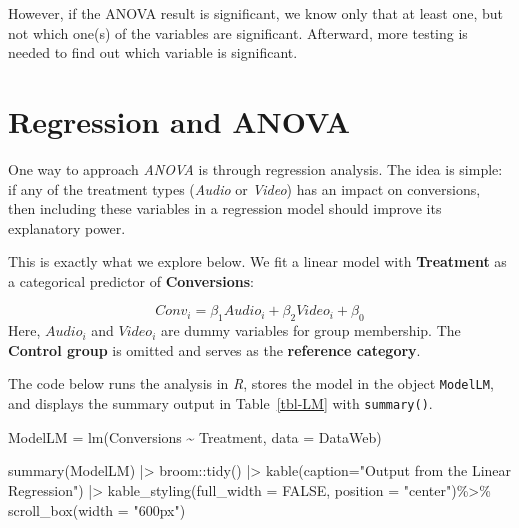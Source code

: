 \documentclass[
  letterpaper,
  DIV=11,
  numbers=noendperiod]{scrartcl}
\newenvironment{Shaded}{\begin{snugshade}}{\end{snugshade}}
\newcommand{\AttributeTok}[1]{\textcolor[rgb]{0.40,0.45,0.13}{#1}}
\newcommand{\ConstantTok}[1]{\textcolor[rgb]{0.56,0.35,0.01}{#1}}
\newcommand{\FunctionTok}[1]{\textcolor[rgb]{0.28,0.35,0.67}{#1}}
\newcommand{\NormalTok}[1]{\textcolor[rgb]{0.00,0.23,0.31}{#1}}
\newcommand{\OtherTok}[1]{\textcolor[rgb]{0.00,0.23,0.31}{#1}}
\newcommand{\SpecialCharTok}[1]{\textcolor[rgb]{0.37,0.37,0.37}{#1}}
\newcommand{\StringTok}[1]{\textcolor[rgb]{0.13,0.47,0.30}{#1}}
\begin{document}
However, if the ANOVA result is significant, we know only that at least
one, but not which one(s) of the variables are significant. Afterward,
more testing is needed to find out which variable is significant.

\section{Regression and ANOVA}\label{regression-and-anova}

One way to approach \emph{ANOVA} is through regression analysis. The
idea is simple: if any of the treatment types (\emph{Audio} or
\emph{Video}) has an impact on conversions, then including these
variables in a regression model should improve its explanatory power.

This is exactly what we explore below. We fit a linear model with
\textbf{Treatment} as a categorical predictor of \textbf{Conversions}:

\[Conv_i=\beta_1 Audio_i+\beta_2 Video_i+ \beta_0\] Here, \(Audio_i\)
and \(Video_i\) are dummy variables for group membership. The
\textbf{Control group} is omitted and serves as the \textbf{reference
category}.

The code below runs the analysis in \emph{R}, stores the model in the
object \texttt{ModelLM}, and displays the summary output in
Table~\ref{tbl-LM} with \texttt{summary()}.

\begin{Shaded}
\begin{Highlighting}[]
\NormalTok{ModelLM }\OtherTok{=} \FunctionTok{lm}\NormalTok{(Conversions }\SpecialCharTok{\textasciitilde{}}\NormalTok{ Treatment, }\AttributeTok{data =}\NormalTok{ DataWeb)}

\FunctionTok{summary}\NormalTok{(ModelLM) }\SpecialCharTok{|\textgreater{}} 
\NormalTok{broom}\SpecialCharTok{::}\FunctionTok{tidy}\NormalTok{() }\SpecialCharTok{|\textgreater{}} 
\FunctionTok{kable}\NormalTok{(}\AttributeTok{caption=}\StringTok{"Output from the Linear Regression"}\NormalTok{) }\SpecialCharTok{|\textgreater{}} 
\FunctionTok{kable\_styling}\NormalTok{(}\AttributeTok{full\_width =} \ConstantTok{FALSE}\NormalTok{, }\AttributeTok{position =} \StringTok{"center"}\NormalTok{)}\SpecialCharTok{\%\textgreater{}\%}
\FunctionTok{scroll\_box}\NormalTok{(}\AttributeTok{width =} \StringTok{"600px"}\NormalTok{)}
\end{Highlighting}
\end{Shaded}
\end{document}
